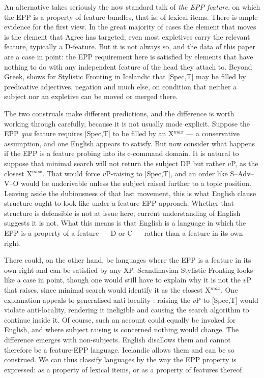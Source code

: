 \documentclass[11pt]{article}
\begin{document}
An alternative takes seriously the now standard talk of \emph{the EPP feature}, on which the EPP is a property of feature bundles, that is, of lexical items.  There is ample evidence for the first view.  In the great majority of cases the element that moves is the element that Agree has targeted; even most expletives carry the relevant feature, typically a D-feature.  But it is not always so, and the data of this paper are a case in point: the EPP requirement here is satisfied by elements that have nothing to do with any independent feature of the head they attach to.  Beyond Greek, \citet{holmberg:00} shows for Stylistic Fronting in Icelandic that [Spec,T] may be filled by predicative adjectives, negation and much else, on condition that neither a subject nor an expletive can be moved or merged there.

The two construals make different predictions, and the difference is worth working through carefully, because it is not usually made explicit.  Suppose the EPP \emph{qua} feature requires [Spec,T] to be filled by an X$^{max}$ --- a conservative assumption, and one English appears to satisfy.  But now consider what happens if the EPP is a feature probing into its c-command domain.  It is natural to suppose that minimal search will not return the subject DP but rather $v$P, as the closest X$^{max}$.  That would force $v$P-raising to [Spec,T], and an order like S--Adv--V--O would be underivable unless the subject raised further to a topic position.  Leaving aside the dubiousness of that last movement, this is what English clause structure ought to look like under a feature-EPP approach.  Whether that structure is defensible is not at issue here; current understanding of English suggests it is not.  What this means is that English is a language in which the EPP is a property of a feature --- D or C --- rather than a feature in its own right.

There could, on the other hand, be languages where the EPP is a feature in its own right and can be satisfied by any XP.  Scandinavian Stylistic Fronting looks like a case in point, though one would still have to explain why it is not the $v$P that raises, since minimal search would identify it as the closest X$^{max}$.  One explanation appeals to generalised anti-locality \citep[et seq.]{abels:03}: raising the $v$P to [Spec,T] would violate anti-locality, rendering it ineligible and causing the search algorithm to continue inside it.  Of course, such an account could equally be invoked for English, and where subject raising is concerned nothing would change.  The difference emerges with non-subjects.  English disallows them and cannot therefore be a feature-EPP language.  Icelandic allows them and can be so construed.  We can thus classify languages by the way the EPP property is expressed: as a property of lexical items, or as a property of features thereof.
\end{document}
